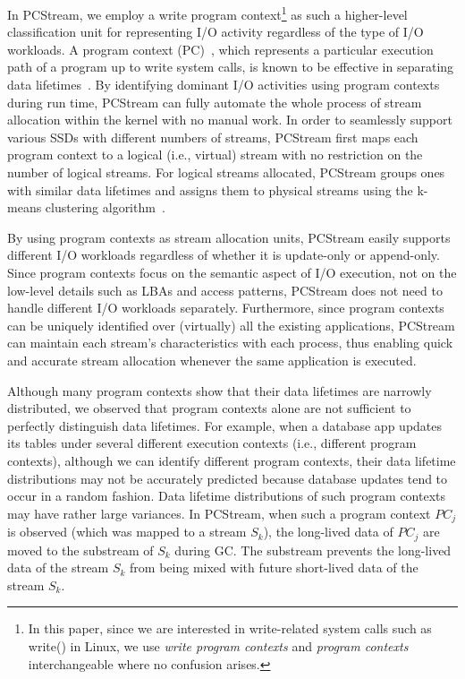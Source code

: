 In \textsf{\small PCStream}, we employ a write program context\footnote{In this paper, since we are 
interested in write-related system calls such as write() in Linux, 
we use {\it write program contexts} and {\it
program contexts} interchangeable where no confusion arises.} as such a higher-level 
classification unit for representing I/O activity regardless of the type of I/O workloads. 
A program context (PC)~\cite{PC, PC2}, which represents a particular execution path of a program 
up to write system calls,
is known to be effective in separating data lifetimes~\cite{PCHa}.  
By identifying dominant I/O activities using program contexts during run time, 
\textsf{\small PCStream} can fully automate the whole process of stream allocation within the 
kernel with no manual work.  In order to
seamlessly support various SSDs with different numbers of streams, \textsf{\small PCStream} first maps 
each program context to a logical (i.e., virtual) stream with no restriction 
on the number of logical streams.
For logical streams allocated, \textsf{\small PCStream} groups ones with similar data lifetimes 
and assigns them to physical streams using the k-means clustering algorithm~\cite{kmeans}. 

By using program contexts as stream allocation units, \textsf{\small PCStream} easily 
supports different I/O workloads regardless of whether it is update-only or append-only.   
Since program contexts focus on the
semantic aspect of I/O execution, not on the low-level details such as 
LBAs and access patterns, \textsf{\small PCStream} does not need to handle different I/O workloads 
separately.  Furthermore,
since program contexts can be uniquely identified over (virtually) all the 
existing applications, \textsf{\small PCStream} can maintain each stream's characteristics 
with each process, thus enabling quick and
accurate stream allocation whenever the same application is executed.

Although many program contexts show that their data lifetimes are 
narrowly distributed, we observed 
that program contexts alone are not sufficient to perfectly distinguish data lifetimes.  
For example, when a database app updates its 
tables under several different execution contexts (i.e., different program contexts),
although we can identify 
different program contexts, their data
lifetime distributions may not be accurately predicted because database 
updates tend to occur in a random fashion.  
Data lifetime distributions of such program contexts may have rather large variances.
In \textsf{\small PCStream}, 
when such a program context {\it $PC_j$} is observed 
(which was mapped to a stream {\it $S_k$}), 
the long-lived data of {\it $PC_j$} are moved to the substream of {\it $S_k$}
during GC.  
The substream prevents the long-lived data of the stream {\it $S_k$} 
from being mixed with future short-lived data of the stream {\it $S_k$}.


